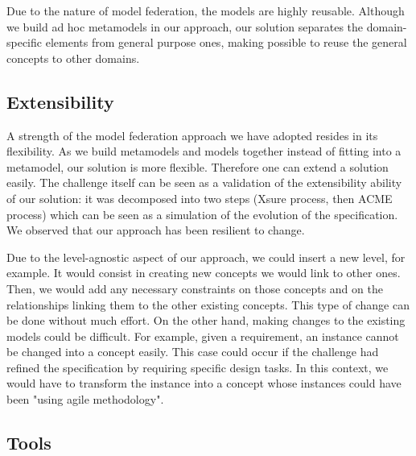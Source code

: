   Due to the nature of model federation, the models are highly reusable.
  Although we build ad hoc metamodels in our approach, our solution separates
  the domain-specific elements from general purpose ones, making possible to
  reuse the general concepts to other domains.

  \subsection{Extensibility}


  A strength of the  model federation approach we have adopted resides in its
  flexibility. As we build metamodels and models together instead of fitting
  into a metamodel, our solution is more flexible. Therefore one can extend a
  solution easily. The challenge itself can be seen as a validation of the
  extensibility ability of our solution: it was decomposed into two steps
  (Xsure process, then ACME process) which can be seen as a simulation of the
  evolution of the  specification. We observed that our approach has been
  resilient to change.

  Due to the level-agnostic aspect of our approach, we could insert a new
  level, for example. It would consist in creating new concepts we would link
  to other ones. Then, we would add any necessary constraints on those concepts
  and on the relationships linking them to the other existing concepts. This
  type of change can be done without much effort. On the other hand, making
  changes to the existing models could be difficult. For example, given a
  requirement, an instance cannot be changed into a concept easily. This case
  could occur if the challenge had refined the specification by requiring
  specific design tasks.  In this context, we would have to transform the
   instance into a concept whose instances could have been
  "using agile methodology".



\subsection{Tools}

